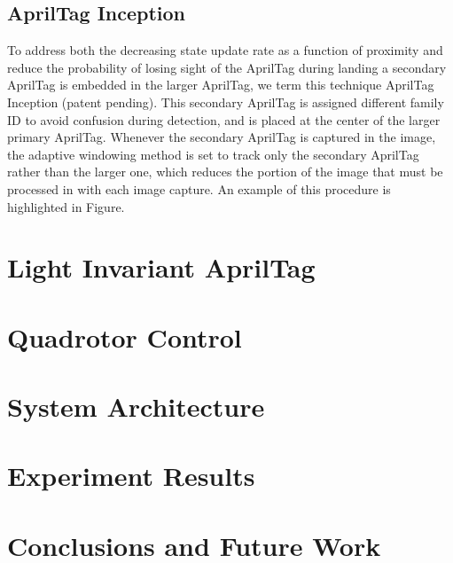 \documentclass[letterpaper, 10 pt, conference]{ieeeconf}
\begin{document}
\subsection{AprilTag Inception}
To address both the decreasing state update rate as a function of proximity and
reduce the probability of losing sight of the AprilTag during landing a
secondary AprilTag is embedded in the larger AprilTag, we term this technique
AprilTag Inception (patent pending). This secondary AprilTag is assigned
different family ID to avoid confusion during detection, and is placed at the
center of the larger primary AprilTag. Whenever the secondary AprilTag is
captured in the image, the adaptive windowing method is set to track only the
secondary AprilTag rather than the larger one, which reduces the portion of the
image that must be processed in with each image capture. An example of this
procedure is highlighted in Figure.

\section{Light Invariant AprilTag}


\section{Quadrotor Control}


\section{System Architecture}


\section{Experiment Results}



\section{Conclusions and Future Work}



\end{document}
